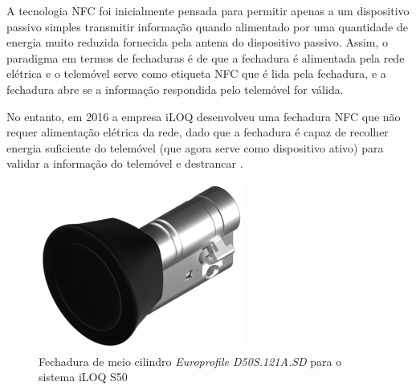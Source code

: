 \documentclass[11pt, a4paper, oneside]{book}
\begin{document}
A tecnologia NFC foi inicialmente pensada para permitir apenas a um dispositivo passivo simples transmitir informação quando alimentado por uma quantidade de energia muito reduzida fornecida pela antena do dispositivo passivo. Assim, o paradigma em termos de fechaduras é de que a fechadura é alimentada pela rede elétrica e o telemóvel serve como etiqueta NFC que é lida pela fechadura, e a fechadura abre se a informação respondida pelo telemóvel for válida.

No entanto, em 2016 a empresa iLOQ desenvolveu uma fechadura NFC que não requer alimentação elétrica da rede, dado que a fechadura é capaz de recolher energia suficiente do telemóvel (que agora serve como dispositivo ativo) para validar a informação do telemóvel e destrancar \cite{iloq-news, iloq-faq}.

\begin{figure}[ht]
  \centering
  \includegraphics[scale=0.50]{img/europrofile-half-cylinder-D50S-121A-SD.png}
  \caption{Fechadura de meio cilindro \textit{Europrofile D50S.121A.SD} para o sistema iLOQ S50 \cite{iloq-lock}}
\end{figure}

\nocite{*}

\clearpage
{}



\end{document}
